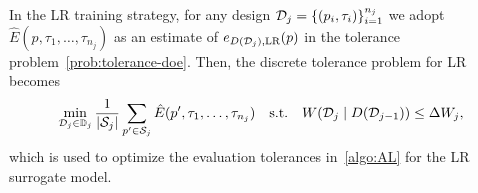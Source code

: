 In the LR training strategy, for any design $\mathcal D_j = \{ (p_i, \tau_i) \}_{i=1}^{n_j}$ we adopt $\hat{E} (p, \tau_1, \dots, \tau_{n_j})$ as an estimate of $e_{D(\mathcal D_j), \text{LR}}(p)$ in the tolerance problem~\eqref{prob:tolerance-doe}.
Then, the discrete tolerance problem for LR becomes
\begin{equation}\label{prob:discrete-tol-LR}       
    \min_{\mathcal D_{j} \in \mathbb D_j} \frac{1}{|\mathcal S_j|} \sum_{p' \in \mathcal S_j} \hat E(p', \tau_1, \dots, \tau_{n_j})  \quad \text{s.t.} 
    \quad W(\mathcal D_{j} \mid D(\mathcal D_{j-1}) ) \le \Delta W_j, 
\end{equation} 
which is used to optimize the evaluation tolerances in~\ref{algo:AL} for the LR surrogate model. \newline